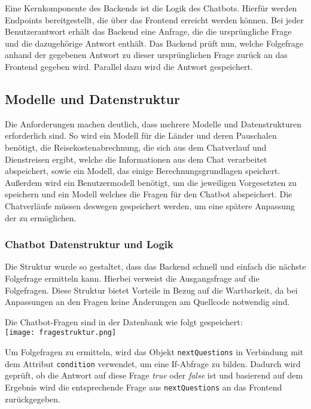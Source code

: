 Eine Kernkomponente des Backends ist die Logik des Chatbots. Hierfür werden Endpoints bereitgestellt, die über das Frontend erreicht werden können. Bei jeder Benutzerantwort erhält das Backend eine Anfrage, die die ursprüngliche Frage und die dazugehörige Antwort enthält. Das Backend prüft nun, welche Folgefrage anhand der gegebenen Antwort zu dieser ursprünglichen Frage zurück an das Frontend gegeben wird. Parallel dazu wird die Antwort gespeichert.

\subsection{Modelle und Datenstruktur}
\label{sec:Planungsphase:ModelleDatenstruktur}

Die Anforderungen machen deutlich, dass mehrere Modelle und Datenstrukturen erforderlich sind. So wird ein Modell für die Länder und deren Pauschalen benötigt, die Reisekostenabrechnung, die sich aus dem Chatverlauf und Dienstreisen ergibt, welche die Informationen aus dem Chat verarbeitet abspeichert, sowie ein Modell, das einige Berechnungsgrundlagen speichert. Außerdem wird ein Benutzermodell benötigt, um die jeweiligen Vorgesetzten zu speichern und ein Modell welches die Fragen für den Chatbot abspeichert.
Die Chatverläufe müssen deswegen gespeichert werden, um eine spätere Anpassung der  zu ermöglichen.

\subsubsection{Chatbot Datenstruktur und Logik}
\label{sec:ModelleDatenstruktur:ChatbotDatenstrukturLogik}

Die Struktur wurde so gestaltet, dass das Backend schnell und einfach die nächste Folgefrage ermitteln kann. Hierbei verweist die Ausgangsfrage auf die Folgefragen.
Diese Struktur bietet Vorteile in Bezug auf die Wartbarkeit, da bei Anpassungen an den Fragen keine Änderungen am Quellcode notwendig sind.

Die Chatbot-Fragen sind in der Datenbank wie folgt gespeichert:\\
\texttt{[image: fragestruktur.png]}

Um Folgefragen zu ermitteln, wird das Objekt \verb|nextQuestions| in Verbindung mit dem Attribut \verb|condition| verwendet, um eine If-Abfrage zu bilden. Dadurch wird geprüft, ob die Antwort auf diese Frage \textit{true} oder \textit{false} ist und basierend auf dem Ergebnis wird die entsprechende Frage aus \verb|nextQuestions| an das Frontend zurückgegeben.

